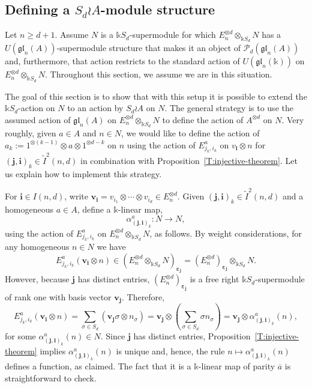 \documentclass[11pt,reqno]{amsart} %
\newcommand{\gl}{\mathfrak{gl}}
\renewcommand{\k}{\mathds{k}}
\newcommand{\0}{\bar{0}}
\newcommand{\1}{\bar{1}}
\newcommand{\parity}[1]{\overline{#1}}
\newcommand{\wreath}{\wr}
\newcommand{\bv}{\mathbf{v}}
\newcommand{\SdwreathA}{S_{d} \wreath A}
\newcommand{\bi}{\mathbf{i}}
\newcommand{\bj}{\mathbf{j}}
\newcommand{\bepsilon}{\boldsymbol{\varepsilon}}
\newcommand{\Itwo}{\tilde{I}^{2}(n,d)}
\newcommand{\Pol}{\mathcal{P}}
\numberwithin{equation}{subsection}
\begin{document}
\subsection{Defining a $\SdwreathA$-module structure}\label{SS:lifting-the-wreath-product-structure}  

Let $n \geq d+1$.  Assume $N$ is a $\k S_{d}$-supermodule for which $E_{n}^{\otimes d} \otimes_{\k S_{d}}N$ has a $U(\gl_{n}(A))$-supermodule structure that makes it an object of $\Pol_{d}(\gl_{n}(A))$ and, furthermore, that action restricts to the standard action of $U(\gl_{n}(\k ))$ on $E_{n}^{\otimes d} \otimes_{\k S_{d}}N$.  Throughout this section,  we assume we are in this situation.

The goal of this section is to show that with this setup it is possible to extend the $\k S_{d}$-action on $N$ to an action by $\SdwreathA$ on $N$.  The general strategy is to use the assumed action of $\gl_{n}(A)$ on $E_{n}^{\otimes d} \otimes_{\k S_{d}}N$ to define the action of $A^{\otimes d}$ on $N$.  Very roughly, given $a \in A$ and $n \in N$, we would like to define the action of $a_{k}:=1^{\otimes (k-1)} \otimes a \otimes 1^{ \otimes d-k}$ on $n$ using the action of $E_{j_{k}, i_{k}}^{a}$ on $v_{\bi} \otimes n$ for $(\bj, \bi)_{k} \in \tilde{I}^{2}(n,d)$ in combination with Proposition~\ref{T:injective-theorem}.  Let us explain how to implement this strategy.



For $\bi \in I(n,d)$, write $\bv_{\bi} = v_{i_{1}}\otimes\dotsb \otimes v_{i_{d}} \in E_{n}^{\otimes d}$.  Given $ (\bj , \bi )_{k} \in \Itwo$ and a homogeneous $a \in A$, define a $\k$-linear map, 
\[
\alpha_{(\bj, \bi)_{k}}^{a}: N \to N,
\] using the action of $E_{j_{k}, i_{k}}^{a}$ on $E_{n}^{\otimes d} \otimes_{\k S_{d}} N$, as follows.   By weight considerations, for any homogeneous $n \in N$ we have
\[
E_{j_{k},i_{k}}^{a}(\bv_{\bi} \otimes n)  \in \left(E_{n}^{\otimes d} \otimes_{\k S_{d}} N \right)_{\bepsilon_{\bj}} = \left(E_{n}^{\otimes d}\right)_{\bepsilon_{\bj}} \otimes_{\k S_{d}} N.
\] However, because $\bj$ has distinct entries, $\left(E_{n}^{\otimes d}\right)_{\bepsilon_{\bj}}$  is a free right $\k S_{d}$-supermodule of rank one with basis vector $\bv_{\bj}$.  Therefore, 
\[
E_{j_{k},i_{k}}^{a}(\bv_{\bi} \otimes n) = \sum_{\sigma \in S_{d}} \left(  \bv_{\bj}\sigma \otimes n_{\sigma}\right) =  \bv_{\bj} \otimes \left(\sum_{\sigma \in S_{d}} \sigma  n_{\sigma}\right) = \bv_{\bj} \otimes  \alpha_{(\bj , \bi)_{k}}^{a} (n),
\]  for some $\alpha_{(\bj , \bi)_{k}}^{a} (n) \in N$.  Since $\bj$ has distinct entries, Proposition~\ref{T:injective-theorem} implies $\alpha_{(\bj , \bi)_{k}}^{a}(n)$ is unique and, hence, the rule $n \mapsto \alpha_{(\bj , \bi)_{k}}^{a}(n)$ defines a function, as claimed. The fact that it is a $\k$-linear map of parity $\parity{a}$ is straightforward to check.
\end{document}
